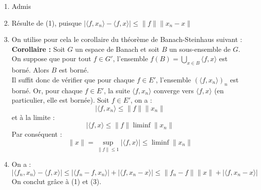 
\begin{dem}
\begin{enumerate}
\item Admis
\item Résulte de (1), puisque $|\langle f, x_n\rangle - \langle f,x\rangle|\leq \|f\|\|x_n-x\|$
\item On utilise pour cela le corollaire du théorème de Banach-Steinhaus suivant : \\
	\textbf{Corollaire :} Soit $G$ un espace de Banach et soit $B$ un sous-ensemble de $G$. On suppose que pour tout $f\in G'$, l'ensemble $f(B)=\bigcup_{x\in B}\langle f,x\rangle$ est borné. Alors $B$ est borné.\\
Il suffit donc de vérifier que pour chaque $f\in E'$, l'ensemble $(\langle f, x_n\rangle)_n$ est borné. Or, pour chaque $f\in E'$, la suite $\langle f,x_n\rangle$ converge vers $\langle f,x\rangle$ (en particulier, elle est bornée). Soit $f\in E'$, on a : \[|\langle f,x_n\rangle\leq \|f\|\|x_n\|\]
et à la limite : \[|\langle f,x\rangle\leq \|f\|\liminf \|x_n\|\]
Par conséquent : \[\|x\|=\sup_{\|f\|\leq 1} |\langle f,x\rangle|\leq \liminf \|x_n\|\]
\item On a :
	\[|\langle f_n,x_n\rangle-\langle f,x\rangle|\leq |\langle f_n-f,x_n\rangle|+|\langle f,x_n-x\rangle|\leq\|f_n-f\|\|x\|+|\langle f,x_n-x\rangle|\]
On conclut grâce à (1) et (3).
\end{enumerate}
\end{dem}

